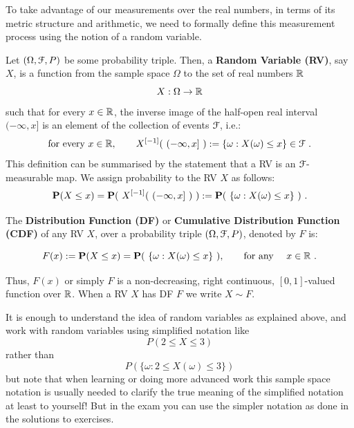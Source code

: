 To take advantage of our measurements over the real numbers, in terms of its  metric structure and arithmetic, we need to formally define this measurement process using the notion of a random variable.
\begin{definition}\label{D:RV}
Let $(\Omega, \mathcal{F},P)$ be some probability triple.  Then, a {\bf Random Variable (RV)}, say $X$, is a function from the sample space $\Omega$ to the set of real numbers $\mathbb{R}$ 
\[
X : \Omega \rightarrow \mathbb{R}
\]
such that for every $x \in \mathbb{R}$, the inverse image of the half-open real interval $(-\infty,x]$ is an element of the collection of events $\mathcal{F}$, i.e.:
\[
\text{for every $x$} \in \Rz, \qquad X^{[-1]}(\ (-\infty,x] \ ) := \{\omega: X(\omega) \leq x\} \in \C{F} \ .
\]
{\scriptsize This definition can be summarised by the statement that a RV is an  $\mathcal{F}$-measurable map.}
We assign probability to the RV $X$ as follows:
\begin{equation}\label{E:ProbOfRV}
\mathbf{P}(X \leq x)  = \mathbf{P}(\ X^{[-1]}(\ (-\infty,x] \ ) \ ) := \mathbf{P}( \ \{\omega: X(\omega) \leq x\} \ ) \ .
\end{equation}
\end{definition}

\begin{definition}\label{D:DF}
The {\bf Distribution Function (DF)} or {\bf Cumulative Distribution Function (CDF)} of any RV $X$, over a  probability triple $(\Omega, \mathcal{F},P)$, denoted by $F$ is:
\begin{framed}
\begin{equation}\label{E:DF}
F(x) := \mathbf{P}(X \leq x) = \mathbf{P}( \ \{\omega: X(\omega) \leq x\} \ ), \qquad \text{for any }\quad x \in \mathbb{R} \ .
\end{equation}
\end{framed}
Thus, $F(x)$ or simply $F$ is a non-decreasing, right continuous, $[0,1]$-valued function over $\mathbb{R}$.  When a RV $X$ has DF $F$ we write $X \sim F$.
\end{definition}

\begin{rem}[Notation] 
It is enough to understand the idea of random variables as explained above, and work with 
random variables using simplified notation  like \[P(2\leq X\leq 3)\] rather than \[P(\{\omega: 2\leq  X(\omega) \leq 3\})\]
but note that when learning or doing more advanced work this sample space notation is usually needed to clarify the true meaning of the simplified notation at least to yourself! But in the exam you can use the simpler notation as done in the solutions to exercises.
\end{rem}

